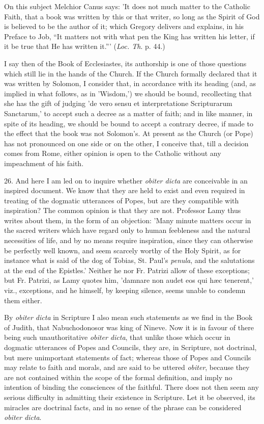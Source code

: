 On this subject Melchior Canus says: 'It does not
much matter to the Catholic Faith, that a book was written by this or
that writer, so long as the Spirit of God is believed to be the author
of it; which Gregory delivers and explains, in his Preface to Job, ``It matters not with what pen the King has written his letter, if it
be true that He has written it.''' (\emph{Loc. Th}. p. 44.)

I say then of the Book of Ecclesiastes, its
authorship is one of those questions which still lie in the hands of
the Church. If the Church formally declared that it was written by
Solomon, I consider that, in accordance with its heading (and, as
implied in what follows, as in 'Wisdom,') we should be bound,
recollecting that she has the gift of judging 'de vero sensu et
interpretatione Scripturarum Sanctarum,' to accept such a decree as a
matter of faith; and in like manner, in spite of its heading, we
should be bound to accept a contrary decree, if made to the effect
that the book was not Solomon's. At present as the Church (or Pope)
has not pronounced on one side or on the other, I conceive that, till
a decision comes from Rome, either opinion is open to the Catholic
without any impeachment of his faith.

26. And here I am led on to inquire whether \emph{obiter
dicta} are conceivable in an inspired document. We know that they
are held to exist and even required in treating of the dogmatic
utterances of Popes, but are they compatible with inspiration? The
common opinion is that they are not. Professor Lamy thus writes
about them, in the form of an objection: 'Many minute matters occur in
the sacred writers which have regard only to human feebleness and the
natural necessities of life, and by no means require inspiration,
since they can otherwise be perfectly well known, and seem scarcely
worthy of the Holy Spirit, as for instance what is said of the dog of
Tobias, St. Paul's \emph{penula}, and the salutations at the end of
the Epistles.' Neither he nor Fr. Patrizi allow of these exceptions;
but Fr. Patrizi, as Lamy quotes him, 'damnare non audet eos qui hæc
tenerent,' viz., exceptions, and he himself, by keeping silence, seems
unable to condemn them either.

By \emph{obiter dicta} in Scripture I also mean
such statements as we find in the Book of Judith, that Nabuchodonosor
was king of Nineve. Now it is in favour of there being such
unauthoritative \emph{obiter dicta}, that unlike those which occur in
dogmatic utterances of Popes and Councils, they are, in Scripture, not
doctrinal, but mere unimportant statements of fact; whereas those of
Popes and Councils may relate to faith and morals, and are said to be
uttered \emph{obiter}, because they are not contained within the scope
of the formal definition, and imply no intention of binding the
consciences of the faithful. There does not then seem any serious
difficulty in admitting their existence in Scripture. Let it be
observed, its miracles are doctrinal facts, and in no sense of the
phrase can be considered \emph{obiter dicta}.

